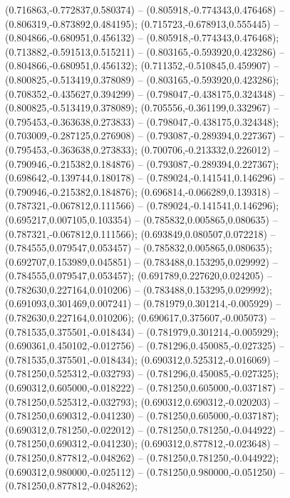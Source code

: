  (0.716863,-0.772837,0.580374) -- (0.805918,-0.774343,0.476468) -- (0.806319,-0.873892,0.484195);
 (0.715723,-0.678913,0.555445) -- (0.804866,-0.680951,0.456132) -- (0.805918,-0.774343,0.476468);
 (0.713882,-0.591513,0.515211) -- (0.803165,-0.593920,0.423286) -- (0.804866,-0.680951,0.456132);
 (0.711352,-0.510845,0.459907) -- (0.800825,-0.513419,0.378089) -- (0.803165,-0.593920,0.423286);
 (0.708352,-0.435627,0.394299) -- (0.798047,-0.438175,0.324348) -- (0.800825,-0.513419,0.378089);
 (0.705556,-0.361199,0.332967) -- (0.795453,-0.363638,0.273833) -- (0.798047,-0.438175,0.324348);
 (0.703009,-0.287125,0.276908) -- (0.793087,-0.289394,0.227367) -- (0.795453,-0.363638,0.273833);
 (0.700706,-0.213332,0.226012) -- (0.790946,-0.215382,0.184876) -- (0.793087,-0.289394,0.227367);
 (0.698642,-0.139744,0.180178) -- (0.789024,-0.141541,0.146296) -- (0.790946,-0.215382,0.184876);
 (0.696814,-0.066289,0.139318) -- (0.787321,-0.067812,0.111566) -- (0.789024,-0.141541,0.146296);
 (0.695217,0.007105,0.103354) -- (0.785832,0.005865,0.080635) -- (0.787321,-0.067812,0.111566);
 (0.693849,0.080507,0.072218) -- (0.784555,0.079547,0.053457) -- (0.785832,0.005865,0.080635);
 (0.692707,0.153989,0.045851) -- (0.783488,0.153295,0.029992) -- (0.784555,0.079547,0.053457);
 (0.691789,0.227620,0.024205) -- (0.782630,0.227164,0.010206) -- (0.783488,0.153295,0.029992);
 (0.691093,0.301469,0.007241) -- (0.781979,0.301214,-0.005929) -- (0.782630,0.227164,0.010206);
 (0.690617,0.375607,-0.005073) -- (0.781535,0.375501,-0.018434) -- (0.781979,0.301214,-0.005929);
 (0.690361,0.450102,-0.012756) -- (0.781296,0.450085,-0.027325) -- (0.781535,0.375501,-0.018434);
 (0.690312,0.525312,-0.016069) -- (0.781250,0.525312,-0.032793) -- (0.781296,0.450085,-0.027325);
 (0.690312,0.605000,-0.018222) -- (0.781250,0.605000,-0.037187) -- (0.781250,0.525312,-0.032793);
 (0.690312,0.690312,-0.020203) -- (0.781250,0.690312,-0.041230) -- (0.781250,0.605000,-0.037187);
 (0.690312,0.781250,-0.022012) -- (0.781250,0.781250,-0.044922) -- (0.781250,0.690312,-0.041230);
 (0.690312,0.877812,-0.023648) -- (0.781250,0.877812,-0.048262) -- (0.781250,0.781250,-0.044922);
 (0.690312,0.980000,-0.025112) -- (0.781250,0.980000,-0.051250) -- (0.781250,0.877812,-0.048262);
